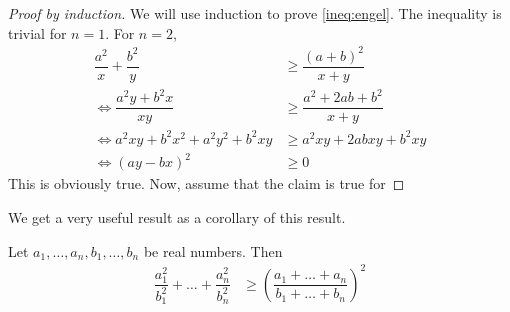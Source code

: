 \documentclass{subfile}
\begin{document}
		\begin{proof}[Proof by induction]
			We will use induction to prove \ref{ineq:engel}. The inequality is trivial for $n=1$. For $n=2$,
				\begin{align*}
					\dfrac{a^2}{x}+\dfrac{b^2}{y}
						& \geq\dfrac{(a+b)^2}{x+y}\\
					\iff\dfrac{a^2y+b^2x}{xy}
						& \geq\dfrac{a^2+2ab+b^2}{x+y}\\
					\iff a^2xy+b^2x^2+a^2y^2+b^2xy
						& \geq a^2xy+2abxy+b^2xy\\
					\iff (ay-bx)^2
						& \geq0
				\end{align*}
			This is obviously true. Now, assume that the claim is true for 
		\end{proof}
	We get a very useful result as a corollary of this result.
		\begin{theorem}
			Let $a_1,\ldots,a_n,b_1,\ldots,b_n$ be real numbers. Then
				\begin{align*}
					\dfrac{a_1^2}{b_1^2}+\ldots+\dfrac{a_n^2}{b_n^2}
						& \geq\left(\dfrac{a_1+\ldots+a_n}{b_1+\ldots+b_n}\right)^2
				\end{align*}
		\end{theorem}
	
\end{document}
